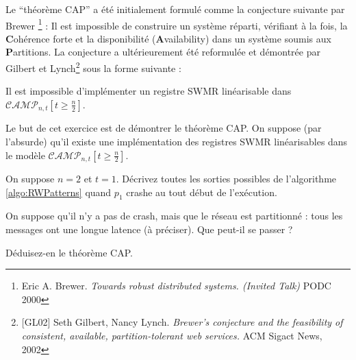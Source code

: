 
\begingroup

\begin{exercice}
  Le ``théorème CAP'' a été initialement formulé comme la conjecture suivante par Brewer \footnote{Eric A. Brewer. \emph{Towards robust distributed systems. (Invited Talk)} PODC 2000} :
  Il est impossible de construire un système réparti, vérifiant à la fois, la \textbf{C}ohérence forte et la disponibilité (\textbf{A}vailability) 
  dans un système soumis aux \textbf{P}artitions. La conjecture a ultérieurement été reformulée et démontrée par Gilbert et Lynch\footnote{[GL02] Seth Gilbert, Nancy Lynch. \emph{Brewer's conjecture and the feasibility of consistent, available, partition-tolerant web services.} ACM Sigact News, 2002} sous la forme suivante :
  \begin{theorem}[CAP]
    Il est impossible d'implémenter un registre SWMR linéarisable dans $\mathcal{CAMP}_{n, t}\left[t\ge\frac{n}{2}\right]$. 
  \end{theorem}

  Le but de cet exercice est de démontrer le théorème CAP. On suppose (par l'absurde) qu'il existe une implémentation des registres SWMR linéarisables dans le modèle $\mathcal{CAMP}_{n, t}\left[t\ge\frac{n}{2}\right]$.
  \begin{questions}
  \item On suppose $n=2$ et $t=1$. Décrivez toutes les sorties possibles de l'algorithme \ref{algo:RWPatterns} quand $p_1$ crashe au tout début de l'exécution. 
  \item On suppose qu'il n'y a pas de crash, mais que le réseau est partitionné : tous les messages ont une longue latence (à préciser). Que peut-il se passer ? 
  \item Déduisez-en le théorème CAP.
  \end{questions}
\end{exercice}

\endgroup
\endinput
